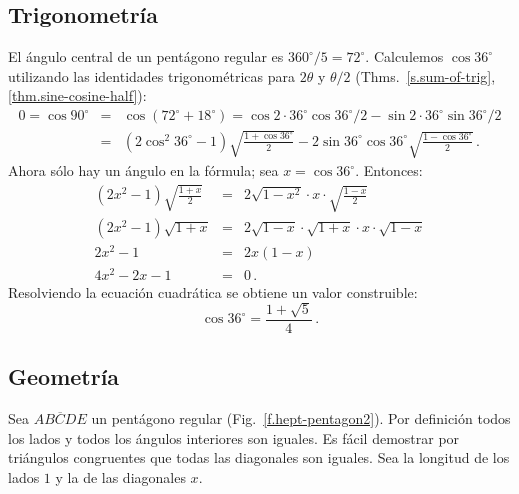 \subsection{Trigonometría}
El ángulo central de un pentágono regular es $360^\circ/5=72^\circ$. Calculemos $\cos 36^\circ$ utilizando las identidades trigonométricas para $2\theta$ y $\theta/2$ (Thms.~\ref{s.sum-of-trig}, \ref{thm.sine-cosine-half}):
\begin{eqnarray*}
0=\cos 90^\circ &=& \cos(72^\circ+18^\circ)=\cos 2\cdot 36^\circ\cos 36^\circ/2 - \sin 2\cdot 36^\circ\sin 36^\circ/2\\
&=&(2\cos^2 36^\circ-1)\sqrt{\frac{1+\cos 36^\circ}{2}}-2\sin 36^\circ\cos 36^\circ\sqrt{\frac{1-\cos 36^\circ}{2}}\,.
\end{eqnarray*}
Ahora sólo hay un ángulo en la fórmula; sea $x=\cos 36^\circ$. Entonces:
\begin{eqnarray*}
(2x^2-1)\sqrt{\frac{1+x}{2}}&=&2\sqrt{1-x^2}\cdot x \cdot \sqrt{\frac{1-x}{2}}\\
(2x^2-1)\sqrt{1+x}&=&2\sqrt{1-x}\cdot\sqrt{1+x}\cdot x \cdot \sqrt{1-x}\\
2x^2-1&=&2x(1-x)\\
4x^2-2x-1&=&0\,.
\end{eqnarray*}
Resolviendo la ecuación cuadrática se obtiene un valor construible:
\[
\cos 36^\circ = \frac{1+\sqrt{5}}{4}\,.
\]

\subsection{Geometría}\label{s.geometry-pentagon}

Sea $\overline{ABCDE}$ un pentágono regular (Fig.~\ref{f.hept-pentagon2}). Por definición todos los lados y todos los ángulos interiores son iguales. Es fácil demostrar por triángulos congruentes que todas las diagonales son iguales. Sea la longitud de los lados $1$ y la de las diagonales $x$.

